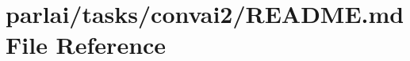 \hypertarget{parlai_2tasks_2convai2_2README_8md}{}\section{parlai/tasks/convai2/\+R\+E\+A\+D\+ME.md File Reference}
\label{parlai_2tasks_2convai2_2README_8md}
